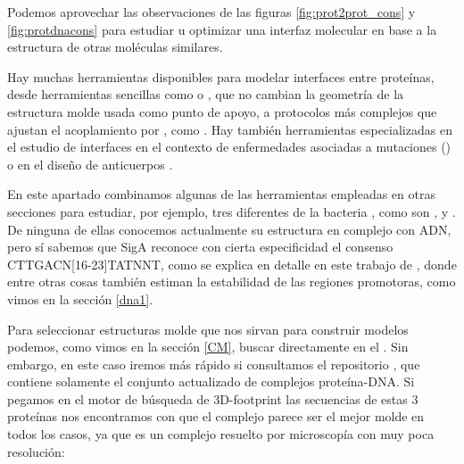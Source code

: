 Podemos aprovechar las observaciones de las figuras \ref{fig:prot2prot_cons} y \ref{fig:protdnacons}  
para estudiar u optimizar una interfaz molecular en base a la estructura de otras mol\'{e}culas similares.

Hay muchas herramientas disponibles para modelar interfaces entre prote\'{i}nas,
desde herramientas sencillas como 
 o
,
que no cambian la geometr\'{i}a de la estructura molde usada como punto de apoyo,
a protocolos m\'{a}s complejos que ajustan el acoplamiento por ,
como .
Hay tambi\'{e}n herramientas especializadas en el estudio de interfaces en el contexto
de enfermedades asociadas a mutaciones ()
o en el dise\~{n}o de anticuerpos \citep{Lapidoth2015,Baran2017}.

En este apartado combinamos algunas de las herramientas empleadas en otras secciones para estudiar, por ejemplo, tres diferentes 
de la bacteria , 
como son ,
 y
.
De ninguna de ellas conocemos actualmente su estructura en complejo con ADN,
pero s\'{i} sabemos que SigA reconoce con cierta especificidad el consenso CTTGACN[16-23]TATNNT, 
como se explica en detalle en este trabajo de \cite{RamirezRomero2006}, 
donde entre otras cosas tambi\'{e}n estiman la estabilidad
de las regiones promotoras, como vimos en la secci\'{o}n \ref{dna1}.

Para seleccionar estructuras molde que nos sirvan para construir modelos podemos,
como vimos en la secci\'{o}n \ref{CM}, buscar directamente en el .
Sin embargo, en este caso iremos m\'{a}s r\'{a}pido si consultamos el repositorio 
 \citep{ContrerasMoreira2010}, 
que contiene solamente el conjunto actualizado de complejos prote\'{i}na-DNA.
Si pegamos en el motor de b\'{u}squeda de 3D-footprint las secuencias de estas 3 prote\'{i}nas
nos encontramos con que el complejo 
parece ser el mejor molde en todos los casos, ya que 
es un complejo resuelto por microscop\'{i}a con muy poca resoluci\'{o}n:



